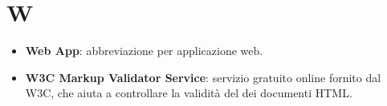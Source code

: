 \section{W}
\begin{itemize}
	\item \textbf{Web App}: abbreviazione per applicazione web.
	\item \textbf{W3C Markup Validator Service}: servizio gratuito online fornito dal W3C, che aiuta a controllare la validità del dei documenti HTML.
\end{itemize}